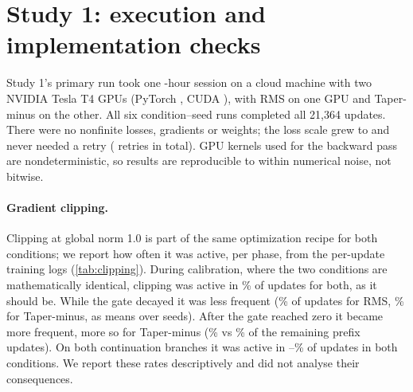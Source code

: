 \documentclass[11pt]{article}
\begin{document}
\section{Study 1: execution and implementation checks}
\label{sec:execution}

Study 1's primary run took one \sessionHours-hour session on a cloud machine with two NVIDIA Tesla T4 GPUs (PyTorch
\torchVersion, CUDA \cudaVersion), with RMS on one GPU and Taper-minus on the other. All six condition--seed runs
completed all 21{,}364 updates. There were no nonfinite losses, gradients or weights; the loss scale grew to
\maxLossScale{} and never needed a retry (\overflowRetries{} retries in total). GPU kernels used for the backward
pass are nondeterministic, so results are reproducible to within numerical noise, not bitwise.

\paragraph{Gradient clipping.} Clipping at global norm 1.0 is part of the same optimization recipe for both
conditions; we report how often it was active, per phase, from the per-update training logs (\cref{tab:clipping}).
During calibration, where the two conditions are mathematically identical, clipping was active in
\clipCalib\% of updates for both, as it should be. While the gate decayed it was less frequent
(\clipDecayRMS\% of updates for RMS, \clipDecayTaper\% for Taper-minus, as means over seeds). After the gate
reached zero it became more frequent, more so for Taper-minus (\clipGateZeroTaper\% vs \clipGateZeroRMS\% of
the remaining prefix updates). On both continuation branches it was active in \clipBranchLo--\clipBranchHi\%
of updates in both conditions. We report these rates descriptively and did not analyse their consequences.

\begin{table}[t]
\centering
\small
\caption{Share of updates with gradient clipping active (pre-clipping global norm $> 1.0$), mean over seeds with
the range across seeds in parentheses, by training phase. $u$ is the global update.}
\label{tab:clipping}

\end{table}
\end{document}
